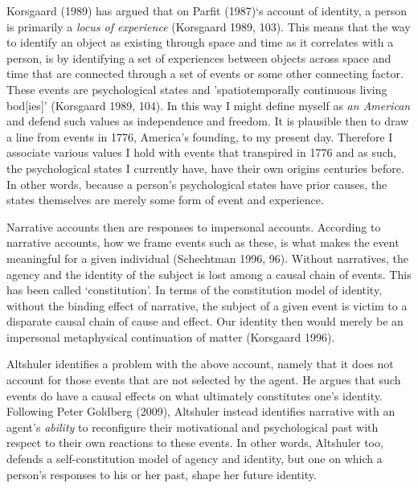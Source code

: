 \documentclass[
  letterpaper,
  DIV=11,
  numbers=noendperiod]{scrreprt}
\begin{document}
\begin{tcolorbox}[enhanced jigsaw, arc=.35mm, breakable, rightrule=.15mm, colback=white, colframe=quarto-callout-important-color-frame, bottomrule=.15mm, leftrule=.75mm, opacityback=0, toprule=.15mm, left=2mm]
\begin{tcolorbox}[enhanced jigsaw, arc=.35mm, breakable, rightrule=.15mm, colback=white, colframe=quarto-callout-tip-color-frame, bottomrule=.15mm, leftrule=.75mm, opacityback=0, toprule=.15mm, left=2mm]
Korsgaard (1989) has argued that on Parfit (1987)`s account of identity,
a person is primarily a \emph{locus of experience} (Korsgaard 1989,
103). This means that the way to identify an object as existing through
space and time as it correlates with a person, is by identifying a set
of experiences between objects across space and time that are connected
through a set of events or some other connecting factor. These events
are psychological states and 'spatiotemporally continuous living
bod{[}ies{]}' (Korsgaard 1989, 104). In this way I might define myself
as \emph{an American} and defend such values as independence and
freedom. It is plausible then to draw a line from events in 1776,
America's founding, to my present day. Therefore I associate various
values I hold with events that transpired in 1776 and as such, the
psychological states I currently have, have their own origins centuries
before. In other words, because a person's psychological states have
prior causes, the states themselves are merely some form of event and
experience.

Narrative accounts then are responses to impersonal accounts. According
to narrative accounts, how we frame events such as these, is what makes
the event meaningful for a given individual (Schechtman 1996, 96).
Without narratives, the agency and the identity of the subject is lost
among a causal chain of events. This has been called `constitution'. In
terms of the constitution model of identity, without the binding effect
of narrative, the subject of a given event is victim to a disparate
causal chain of cause and effect. Our identity then would merely be an
impersonal metaphysical continuation of matter (Korsgaard 1996).

Altshuler identifies a problem with the above account, namely that it
does not account for those events that are not selected by the agent. He
argues that such events do have a causal effects on what ultimately
constitutes one's identity. Following Peter Goldberg (2009), Altshuler
instead identifies narrative with an agent's \emph{ability} to
reconfigure their motivational and psychological past with respect to
their own reactions to these events. In other words, Altshuler too,
defends a self-constitution model of agency and identity, but one on
which a person's responses to his or her past, shape her future
identity.


\end{tcolorbox}
\end{tcolorbox}
\end{document}
